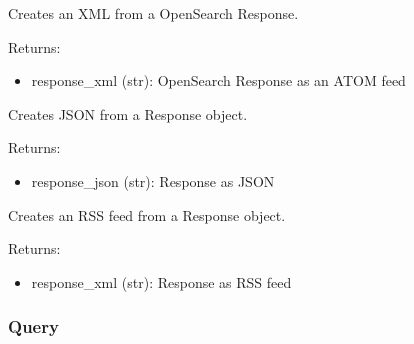 \documentclass[letterpaper,10pt,english]{sphinxmanual}
\begin{document}
\begin{fulllineitems}

\begin{fulllineitems}
\label{api3.0:puppy.model.Response.to_atom}
Creates an XML from a OpenSearch Response.

Returns:
\begin{itemize}
\item {} 
response\_xml (str): OpenSearch Response as an ATOM feed

\end{itemize}

\end{fulllineitems}


\begin{fulllineitems}
\label{api3.0:puppy.model.Response.to_json}
Creates JSON from a Response object.

Returns:
\begin{itemize}
\item {} 
response\_json (str): Response as JSON

\end{itemize}

\end{fulllineitems}


\begin{fulllineitems}
\label{api3.0:puppy.model.Response.to_rss}
Creates an RSS feed from a Response object.

Returns:
\begin{itemize}
\item {} 
response\_xml (str): Response as RSS feed

\end{itemize}

\end{fulllineitems}


\end{fulllineitems}



\subsubsection{Query}
\label{api3.0:query}\label{api3.0:puppy-query}
\end{document}
